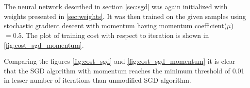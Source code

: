 \section{}
The neural network described in section \ref{sec:sgd} was again initialized with weights
presented in \ref{sec:weights}. It was then trained on the given samples using stochastic gradient descent with momentum
having momentum coefficient($\mu$)$=0.5$. The plot of training cost with respect to iteration is shown in \ref{fig:cost_sgd_momentum}.

Comparing the figures \ref{fig:cost_sgd} and \ref{fig:cost_sgd_momentum} it is clear that the SGD algorithm
with momentum reaches the minimum threshold of 0.01 in lesser number of iterations than unmodified SGD algorithm.
